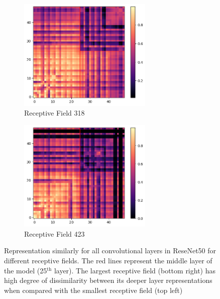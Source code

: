 \begin{figure}[H]
        \begin{subfigure}[b]{0.475\textwidth}   
            \centering 
            \includegraphics[width=0.7\textwidth]{images/resnet50_level3_similarity_cifar10.png}
            \caption[]%
            {{\small Receptive Field 318}}    
            \label{fig:similarity_lvl3}
        \end{subfigure}
        \hfill
        \begin{subfigure}[b]{0.475\textwidth}   
            \centering 
            \includegraphics[width=0.7\textwidth]{images/resnet50_level4_similarity_cifar10.png}
            \caption[]%
            {{\small Receptive Field 423}}    
            \label{fig:similarity_lvl4}
        \end{subfigure}
        \caption[Representation similarity]
        {\small Representation similarly for all convolutional layers in ReseNet50 for different receptive fields. The red lines
        represent the middle layer of the model (25$^{\textrm{th}}$ layer). The largest receptive field (bottom right)
      has high degree of dissimilarity between its deeper layer representations when compared with the smallest
    receptive field (top left)}
        \label{fig:similarity_resenet50}
    \end{figure}

